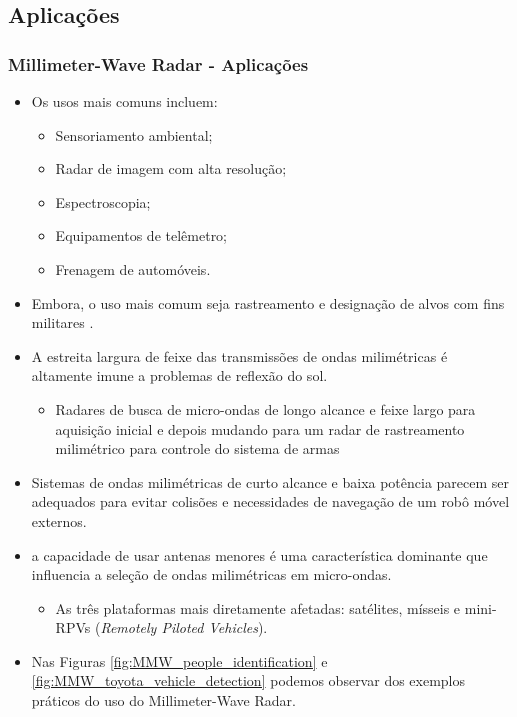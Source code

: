 \documentclass[xcolor=dvipsnames, aspectratio=169]{beamer}
\begin{document}
    \subsection[Introdução]{Aplicações} 
    \begin{frame}
    \frametitle{Millimeter-Wave Radar - Aplicações}
        \begin{itemize}
            \item Os usos mais comuns incluem:
            \begin{itemize}
                \item Sensoriamento ambiental;
                \item Radar de imagem com alta resolução;
                \item Espectroscopia;
                \item Equipamentos de telêmetro;
                \item Frenagem de automóveis.
            \end{itemize}
            \item Embora, o uso mais comum seja rastreamento e designação de alvos com fins militares \cite{everett1995sensors}.
            \item A estreita largura de feixe das transmissões de ondas milimétricas é altamente
            imune a problemas de reflexão do sol.
            \begin{itemize}
                \item Radares de busca de micro-ondas de longo alcance
                e feixe largo para aquisição inicial e depois mudando para um radar de rastreamento
                milimétrico para controle do sistema de armas
            \end{itemize}
            \item Sistemas de ondas milimétricas de curto alcance e baixa potência parecem ser
            adequados para evitar colisões e necessidades de navegação de um robô móvel
            externos.
            \item a capacidade de usar antenas menores é uma característica
            dominante que influencia a seleção de ondas milimétricas em micro-ondas. 
            \begin{itemize}
                \item As três plataformas mais diretamente afetadas: satélites, mísseis e mini-RPVs (\textit{Remotely Piloted Vehicles}).
            \end{itemize}
            \item Nas Figuras \ref{fig:MMW_people_identification} e \ref{fig:MMW_toyota_vehicle_detection} podemos observar dos exemplos práticos do uso do Millimeter-Wave Radar.

\end{itemize}
\end{frame}
\end{document}
